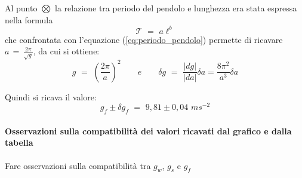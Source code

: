 Al punto $\bigotimes$ la relazione tra periodo del pendolo e lunghezza era stata espressa nella formula
\begin{equation*}
\mathcal{T} \,\, = \,\, a\ell^b
\end{equation*}
che confrontata con l'equazione (\ref{eq:periodo_pendolo}) permette di ricavare $a \, = \, \frac{2 \pi}{\sqrt{g}}$, da cui si ottiene:
\begin{equation}
g \,\, = \,\, \left( \frac{2 \pi}{a}\right)^2 \quad\quad e \quad\quad \delta g \,\, = \,\, \frac{\vert dg \vert}{\vert da\vert} \delta a = \frac{8 \pi^2}{a^3} \delta a
\end{equation}

Quindi si ricava il valore:
\begin{equation}
g_f \pm \delta g_f \,\, = \,\, 9,81 \pm 0,04 \,\, ms^{-2}
\end{equation}

\paragraph{Osservazioni sulla compatibilità dei valori ricavati dal grafico e dalla tabella}

Fare osservazioni sulla compatibilità tra $g_w$, $g_s$ e $g_f$